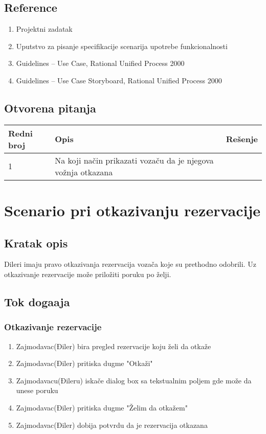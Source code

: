 \documentclass[12pt]{article}
\begin{document}
\subsection{Reference}
\begin{enumerate}
   \item Projektni zadatak
   \item Uputstvo za pisanje specifikacije scenarija upotrebe funkcionalnosti
   \item  Guidelines – Use Case, Rational Unified Process 2000
   \item  Guidelines – Use Case Storyboard, Rational Unified Process 2000
 \end{enumerate}
\subsection{Otvorena pitanja}


\begin{center}
\begin{tabular}{ | m{2cm} | m{7cm}| m{7cm} | } 
\hline
Redni broj& Opis & Rešenje \\ 
\hline
1 & Na koji način prikazati vozaču da je njegova vožnja otkazana & \\ 
\hline
\end{tabular}
\end{center}

    

\section{Scenario pri otkazivanju rezervacije}
\subsection{Kratak opis}
Dileri imaju pravo otkazivanja rezervacija vozača koje su prethodno odobrili. Uz
otkazivanje rezervacije može priložiti poruku po želji.
\subsection{Tok doga\dj aja}

\subsubsection{Otkazivanje rezervacije}
\begin{enumerate}
  \item Zajmodavac(Điler) bira pregled rezervacije koju želi da otkaže
  \item Zajmodavac(Điler) pritiska dugme "Otkaži"
  \item Zajmodavacu(Đileru) iskače dialog box sa tekstualnim poljem gde može da unese poruku
  \item Zajmodavac(Điler) pritiska dugme "Želim da otkažem"
  \item Zajmodavac(Điler) dobija potvrdu da je rezervacija otkazana
\end{enumerate}
\end{document}
